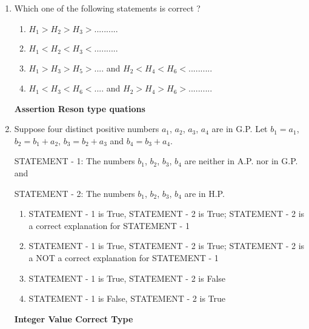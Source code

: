 \begin{enumerate}[label=\arabic*.,ref=\thesubsection.\theenumi]
\item Which one of the following statements is correct ?

\begin{enumerate}
\item $H_1 > H_2 > H_3 >..........$    
\item $H_1 < H_2 < H_3 <..........$        
\item $H_1 > H_3 > H_5>....$ and $H_2 < H_4 < H_6 <..........$
\item $H_1 < H_3 < H_6<....$ and $H_2 > H_4 > H_6 >..........$
\end{enumerate}
\textbf{Assertion Reson type quations} 
\item Suppose four distinct positive numbers $a_1$, $a_2$, $a_3$, $a_4$ are in G.P. Let $b_1 = a_1$, $b_2 = b_1 + a_2$, $b_3 = b_2 + a_3$ and $b_4 = b_3 + a_4$.

STATEMENT - 1: The numbers $b_1$, $b_2$, $b_3$, $b_4$ are neither in A.P. nor in G.P. and

STATEMENT - 2: The numbers $b_1$, $b_2$, $b_3$, $b_4$ are in H.P.
\begin{enumerate}
\item STATEMENT - 1 is True, STATEMENT - 2 is True; STATEMENT - 2 is a correct explanation for STATEMENT - 1
\item STATEMENT - 1 is True, STATEMENT - 2 is True; STATEMENT - 2 is a NOT a correct explanation for STATEMENT - 1
\item STATEMENT - 1 is True, STATEMENT - 2 is False
\item STATEMENT - 1 is False, STATEMENT - 2 is True
\end{enumerate}

\textbf{Integer Value Correct Type}


\end{enumerate}
